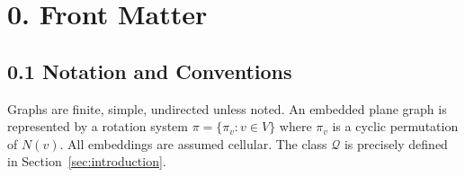 \documentclass[12pt]{article}
\title{A Certified Reduction Framework for Barnette\'s Conjecture\[0.5em]
\large A purely mathematical proof via certified reductions and deterministic lifting}
\author{Charley Lemland}
\date{\today}
\theoremstyle{definition}
\begin{document}
\maketitle

\begin{abstract}
Barnette's Conjecture (1969) asserts that every $3$-connected cubic bipartite plane graph is Hamiltonian.
We present a certified reduction framework (CRF) for this class $\mathcal{Q}$ and give a purely mathematical proof that every $G\in\mathcal{Q}$ contains a Hamiltonian cycle.
The proof combines:
(i) a combinatorial unavoidability theorem (Euler + bipartite parity) forcing a facial $4$-cycle whose neighborhood contains one of three reducible configurations ($C_2$, $C_P=\mathrm{pinch}(ii)$, or refined $C_4$);
(ii) explicit rotation-system level reduction rules together with planarity and invariant preservation proofs; and
(iii) a finite lifting library and interface analysis that deterministically reconstructs a Hamiltonian cycle in $G$ from one in the reduced graph.
A well-founded lexicographic measure guarantees termination, and explicit base cases complete the induction.
\end{abstract}

\section*{0. Front Matter}

\subsection*{0.1 Notation and Conventions}
Graphs are finite, simple, undirected unless noted. An embedded plane graph is represented by a rotation system $\pi = \{\pi_v : v \in V\}$ where $\pi_v$ is a cyclic permutation of $N(v)$. All embeddings are assumed cellular. The class $\mathcal{Q}$ is precisely defined in Section~\ref{sec:introduction}.
\end{document}
